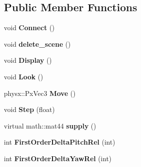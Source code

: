 \subsection*{\-Public \-Member \-Functions}
\begin{DoxyCompactItemize}
\item 
\hypertarget{classneb_1_1camera_1_1camera_a218cc11e01e31704f8da897c945d0e3f}{void {\bfseries \-Connect} ()}\label{classneb_1_1camera_1_1camera_a218cc11e01e31704f8da897c945d0e3f}

\item 
\hypertarget{classneb_1_1camera_1_1camera_a1648a17ee1479e429d6f642aa57245e9}{void {\bfseries delete\-\_\-scene} ()}\label{classneb_1_1camera_1_1camera_a1648a17ee1479e429d6f642aa57245e9}

\item 
\hypertarget{classneb_1_1camera_1_1camera_a1e6c6198d5b7bdd988b50a2b46b70385}{void {\bfseries \-Display} ()}\label{classneb_1_1camera_1_1camera_a1e6c6198d5b7bdd988b50a2b46b70385}

\item 
\hypertarget{classneb_1_1camera_1_1camera_a2c81ea18393516ad0e70316be6b17daf}{void {\bfseries \-Look} ()}\label{classneb_1_1camera_1_1camera_a2c81ea18393516ad0e70316be6b17daf}

\item 
\hypertarget{classneb_1_1camera_1_1camera_a8ce61b5956d05f57c23a9af81a8a3460}{physx\-::\-Px\-Vec3 {\bfseries \-Move} ()}\label{classneb_1_1camera_1_1camera_a8ce61b5956d05f57c23a9af81a8a3460}

\item 
\hypertarget{classneb_1_1camera_1_1camera_a962445a098d9fc97d17e62238b598fc1}{void {\bfseries \-Step} (float)}\label{classneb_1_1camera_1_1camera_a962445a098d9fc97d17e62238b598fc1}

\item 
\hypertarget{classneb_1_1camera_1_1camera_ae58f39bface93cd1949dd99ff6a72e00}{virtual math\-::mat44 {\bfseries supply} ()}\label{classneb_1_1camera_1_1camera_ae58f39bface93cd1949dd99ff6a72e00}

\item 
\hypertarget{classneb_1_1camera_1_1camera_a2afc49581aedd2419fbc15ff8b365a6f}{int {\bfseries \-First\-Order\-Delta\-Pitch\-Rel} (int)}\label{classneb_1_1camera_1_1camera_a2afc49581aedd2419fbc15ff8b365a6f}

\item 
\hypertarget{classneb_1_1camera_1_1camera_a1fd9fdc99f7de5a8a5fe418abb00e723}{int {\bfseries \-First\-Order\-Delta\-Yaw\-Rel} (int)}\label{classneb_1_1camera_1_1camera_a1fd9fdc99f7de5a8a5fe418abb00e723}


\end{DoxyCompactItemize}
